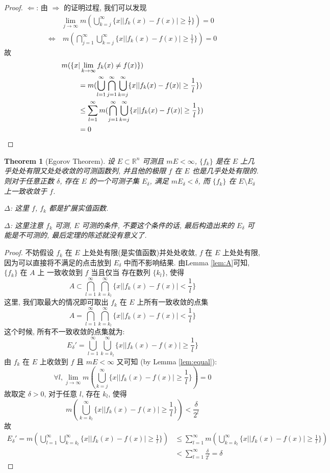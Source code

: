 \documentclass{article}
\newtheorem{theorem}{Theorem}
\begin{document}
\begin{proof}
  $\Leftarrow$: 由 $\Rightarrow$ 的证明过程, 我们可以发现
  \begin{align*}
   & \lim_{j\to\infty} m (\bigcup_{k=j}^\infty\{x| |f_k(x) - f(x)| \geq \frac{1}{l} \}) = 0 \\
   \Leftrightarrow &\ m (\bigcap_{j=1}^\infty\bigcup_{k=j}^\infty\{x| |f_k(x) - f(x)| \geq \frac{1}{l} \}) = 0 
  \end{align*}
  故
  \begin{align*}
    m(\{x&|\lim_{k\to\infty} f_k(x) \not= f(x)\}) \\
    &= m(\bigcup_{l=1}^\infty\bigcap_{j=1}^\infty\bigcup_{k=j}^\infty\{x| |f_k(x) - f(x)| \geq \frac{1}{l} \}) \\
   &\leq \sum_{l=1}^\infty m(\bigcap_{j=1}^\infty\bigcup_{k=j}^\infty\{x| |f_k(x) - f(x)| \geq \frac{1}{l} \}) \\
   &= 0  \qedhere
  \end{align*}
\end{proof}
\begin{theorem}[Egorov Theorem]
  设 $E\subset \mathbb{R}^n$ 可测且 $mE < \infty$, $\{f_k\}$ 是在 $E$ 上几乎处处有限又处处收敛的可测函数列,
  并且他的极限 $f$ 在 $E$ 也是几乎处处有限的. 则对于任意正数 $\delta$, 存在 $E$ 的一个可测子集 $E_\delta$,
  满足 $mE_\delta < \delta$, 而 $\{f_k\}$ 在 $E\setminus E_\delta$ 上一致收敛于 $f$.

  {\color{blue}$\Delta$: 这里 $f$, $f_k$ 都是扩展实值函数.

  $\Delta$: 这里注意 $f_k$ 可测, $E$ 可测的条件, 不要这个条件的话, 最后构造出来的 $E_\delta$ 可能是不可测的, 最后定理的陈述就没有意义了.}
\end{theorem}
\begin{proof}
  不妨假设 $f_k$ 在 $E$ 上处处有限(是实值函数)并处处收敛, $f$ 在 $E$ 上处处有限, 因为可以直接将不满足的点击放到 $E_\delta$ 中而不影响结果.
  由Lemma \ref{lem:A}可知, 
  $\{f_k\}$ 在 $A$ 上 一致收敛到 $f$ 当且仅当 存在数列 $\{k_l\}$, 使得 
  \[A \subset \bigcap_{l=1}^\infty \bigcap_{k=k_l}^\infty \{x| |f_k(x) - f(x)| < \frac{1}{l}\} \]
  这里, 我们取最大的情况即可取出 $f_k$ 在 $E$ 上所有一致收敛的点集
  \[A = \bigcap_{l=1}^\infty \bigcap_{k=k_l}^\infty \{x| |f_k(x) - f(x)| < \frac{1}{l}\} \]
  这个时候, 所有不一致收敛的点集就为:
  \[E_\delta' = \bigcup_{l=1}^\infty\bigcup_{k=k_l}^\infty \{x| |f_k(x) - f(x)| \geq \frac{1}{l}\}\]
  由 $f_k$ 在 $E$ 上收敛到 $f$ 且 $mE < \infty$ 又可知 (by Lemma \ref{lem:equal}):
  \[\forall l, \lim_{j\to\infty} m(\bigcup_{k=j}^\infty\{x| |f_k(x) - f(x)| \geq \frac{1}{l}\}) = 0\]
  故取定 $\delta > 0$, 对于任意 $l$, 存在 $k_l$, 使得
  \[m (\bigcup_{k=k_l}^\infty\{x| |f_k(x) - f(x)| \geq \frac{1}{l}\}) < \frac{\delta}{2^l}\]
  故
  \begin{align*}
    E_\delta' = m(\bigcup_{l=1}^\infty\bigcup_{k=k_l}^\infty \{x| |f_k(x) - f(x)| \geq \frac{1}{l}\}) 
    &\leq \sum_{l=1}^\infty m (\bigcup_{k=k_l}^\infty\{x| |f_k(x) - f(x)| \geq \frac{1}{l}\}) \\
    &< \sum_{l=1}^\infty \frac{\delta}{2^l} = \delta
  \end{align*}
\end{proof}
\end{document}
